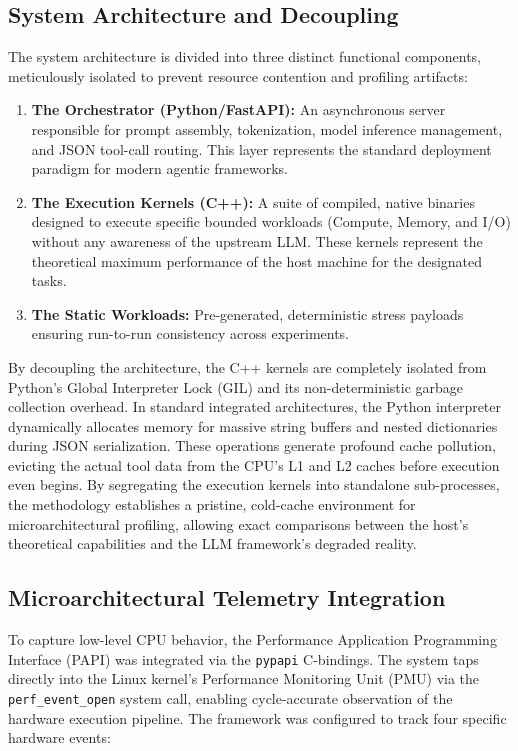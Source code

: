\documentclass[10pt, letterpaper]{article}
\begin{document}
\subsection{System Architecture and Decoupling}
The system architecture is divided into three distinct functional components, meticulously isolated to prevent resource contention and profiling artifacts:

\begin{enumerate}
\item \textbf{The Orchestrator (Python/FastAPI):} An asynchronous server responsible for prompt assembly, tokenization, model inference management, and JSON tool-call routing. This layer represents the standard deployment paradigm for modern agentic frameworks.
\item \textbf{The Execution Kernels (C++):} A suite of compiled, native binaries designed to execute specific bounded workloads (Compute, Memory, and I/O) without any awareness of the upstream LLM. These kernels represent the theoretical maximum performance of the host machine for the designated tasks.
\item \textbf{The Static Workloads:} Pre-generated, deterministic stress payloads ensuring run-to-run consistency across experiments. 
\end{enumerate}

By decoupling the architecture, the C++ kernels are completely isolated from Python's Global Interpreter Lock (GIL) and its non-deterministic garbage collection overhead. In standard integrated architectures, the Python interpreter dynamically allocates memory for massive string buffers and nested dictionaries during JSON serialization. These operations generate profound cache pollution, evicting the actual tool data from the CPU's L1 and L2 caches before execution even begins. By segregating the execution kernels into standalone sub-processes, the methodology establishes a pristine, cold-cache environment for microarchitectural profiling, allowing exact comparisons between the host's theoretical capabilities and the LLM framework's degraded reality.

\subsection{Microarchitectural Telemetry Integration}
To capture low-level CPU behavior, the Performance Application Programming Interface (PAPI) was integrated via the \texttt{pypapi} C-bindings. The system taps directly into the Linux kernel's Performance Monitoring Unit (PMU) via the \texttt{perf\_event\_open} system call, enabling cycle-accurate observation of the hardware execution pipeline. The framework was configured to track four specific hardware events:
\end{document}
